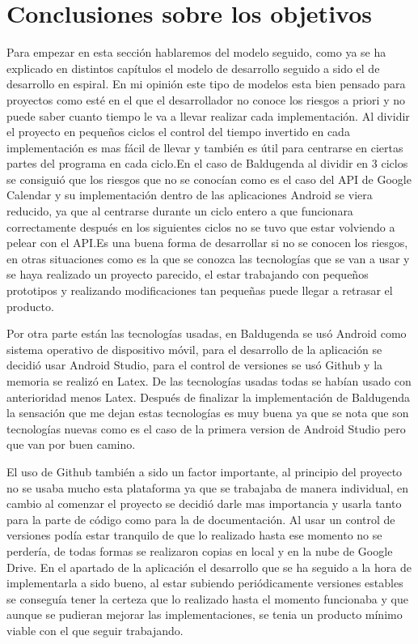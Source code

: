\section{Conclusiones sobre los objetivos}
\label{secc:Conclusiones sobre los objetivos}

Para empezar en esta sección hablaremos del modelo seguido, como ya se ha explicado en distintos capítulos el modelo de desarrollo seguido a sido el de desarrollo en espiral. En mi opinión este tipo de modelos esta bien pensado para proyectos como esté en el que el desarrollador no conoce los riesgos a priori y no puede saber cuanto tiempo le va a llevar realizar cada implementación. Al dividir el proyecto en pequeños ciclos el control del tiempo invertido en cada implementación es mas fácil de llevar y también es útil para centrarse en ciertas partes del programa en cada ciclo.En el caso de Baldugenda al dividir en 3 ciclos se consiguió que los riesgos que no se conocían como es el caso del API de Google Calendar y su implementación dentro de las aplicaciones Android se viera reducido, ya que al centrarse durante un ciclo entero a que funcionara correctamente después en los siguientes ciclos no se tuvo que estar volviendo a pelear con el API.Es una buena forma de desarrollar si no se conocen los riesgos, en otras situaciones como es la que se conozca las tecnologías que se van a usar y se haya realizado un proyecto parecido, el estar trabajando con pequeños prototipos y realizando modificaciones tan pequeñas puede llegar a retrasar el producto.

Por otra parte están las tecnologías usadas, en Baldugenda se usó Android como sistema operativo de dispositivo móvil, para el desarrollo de la aplicación se decidió usar Android Studio, para el control de versiones se usó Github y la memoria se realizó en Latex. De las tecnologías usadas todas se habían usado con anterioridad menos Latex. Después de finalizar la implementación de Baldugenda  la sensación que me dejan estas tecnologías es muy buena ya que se nota que son tecnologías nuevas como es el caso de la primera version de Android Studio pero que van por buen camino. 

El uso de Github también a sido un factor importante, al principio del proyecto no se usaba mucho esta plataforma ya que se trabajaba de manera individual, en cambio al comenzar el proyecto se decidió darle mas importancia y usarla tanto para la parte de código como para la de documentación. Al usar un control de versiones podía estar tranquilo de que lo realizado hasta ese momento no se perdería, de todas formas se realizaron copias en local y en la nube de Google Drive.
\newpage
En el apartado de la aplicación el desarrollo que se ha seguido a la hora de implementarla a sido bueno, al estar subiendo periódicamente versiones estables se conseguía tener la certeza que lo realizado hasta el momento funcionaba y que aunque se pudieran mejorar las implementaciones, se tenia un producto mínimo viable con el que seguir trabajando.

